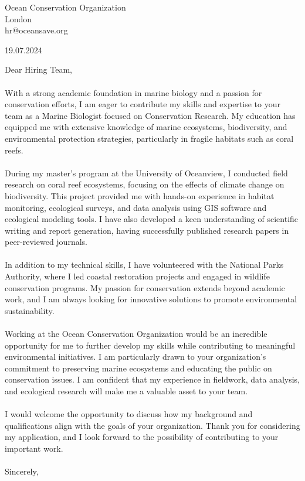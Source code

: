 \documentclass[10pt,a4paper]{letter}
\begin{document}
	
	\begin{spacing}{1.30}
		{\small   
			{Ocean Conservation Organization\\
				London\\
				hr@oceansave.org\\
				
				\begin{flushright}
					19.07.2024
				\end{flushright}
				Dear Hiring Team,\\ \\
				With a strong academic foundation in marine biology and a passion for conservation efforts, I am eager to contribute my skills and expertise to your team as a Marine Biologist focused on Conservation Research. My education has equipped me with extensive knowledge of marine ecosystems, biodiversity, and environmental protection strategies, particularly in fragile habitats such as coral reefs.\\ \\
				During my master’s program at the University of Oceanview, I conducted field research on coral reef ecosystems, focusing on the effects of climate change on biodiversity. This project provided me with hands-on experience in habitat monitoring, ecological surveys, and data analysis using GIS software and ecological modeling tools. I have also developed a keen understanding of scientific writing and report generation, having successfully published research papers in peer-reviewed journals.\\ \\
				In addition to my technical skills, I have volunteered with the National Parks Authority, where I led coastal restoration projects and engaged in wildlife conservation programs. My passion for conservation extends beyond academic work, and I am always looking for innovative solutions to promote environmental sustainability.\\ \\
				Working at the Ocean Conservation Organization would be an incredible opportunity for me to further develop my skills while contributing to meaningful environmental initiatives. I am particularly drawn to your organization’s commitment to preserving marine ecosystems and educating the public on conservation issues. I am confident that my experience in fieldwork, data analysis, and ecological research will make me a valuable asset to your team.\\ \\
				I would welcome the opportunity to discuss how my background and qualifications align with the goals of your organization. Thank you for considering my application, and I look forward to the possibility of contributing to your important work.\\ \\
				Sincerely,\\
				
}}
\end{spacing}
\end{document}
